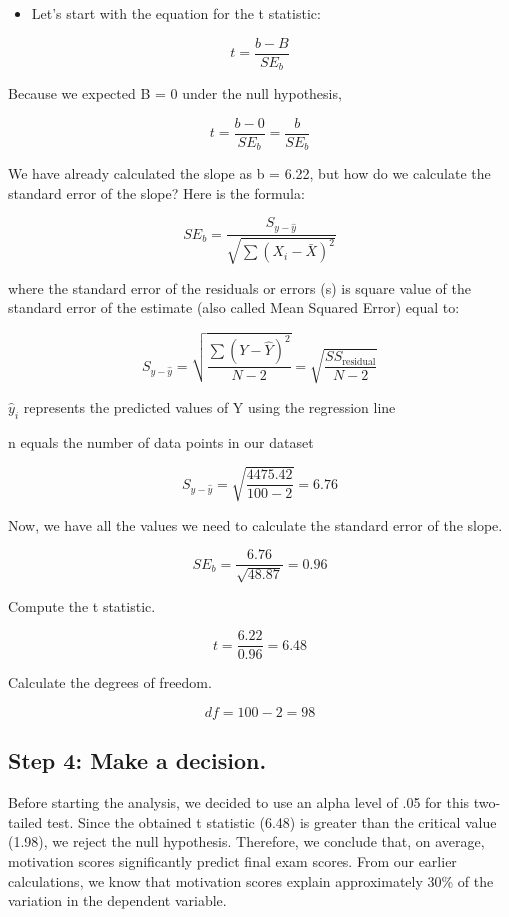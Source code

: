 \documentclass[
  letterpaper,
  DIV=11,
  numbers=noendperiod]{scrreprt}
\providecommand{\tightlist}{%
  \setlength{\itemsep}{0pt}\setlength{\parskip}{0pt}}
\begin{document}
\begin{itemize}
\tightlist
\item
  Let's start with the equation for the t statistic:
\end{itemize}

\[
t = \frac{b - B}{SE_b}
\]

Because we expected B = 0 under the null hypothesis,

\[
t = \frac{b - 0}{SE_b} = \frac{b}{SE_b}
\]

We have already calculated the slope as b = 6.22, but how do we
calculate the standard error of the slope? Here is the formula:

\[
SE_b = \frac{S_{y-\hat{y}}}{\sqrt{\sum (X_i - \bar{X})^2}}
\]

where the standard error of the residuals or errors (s) is square value
of the standard error of the estimate (also called Mean Squared Error)
equal to:

\[
S_{y-\hat{y}} = \sqrt{\frac{\sum (Y - \hat{Y})^2}{N - 2}} = \sqrt{\frac{SS_{\text{residual}}}{N - 2}}
\]

\(\hat{y}_i\) represents the predicted values of Y using the regression
line

n equals the number of data points in our dataset

\[
S_{y-\hat{y}} = \sqrt{\frac{4475.42}{100 - 2}} = 6.76
\]

Now, we have all the values we need to calculate the standard error of
the slope.

\[
SE_b = \frac{6.76}{\sqrt{48.87}} = 0.96
\]

Compute the t statistic.

\[
t = \frac{6.22}{0.96} = 6.48
\]

Calculate the degrees of freedom.

\[
df = 100 - 2 = 98
\]

\subsection*{Step 4: Make a decision.}\label{step-4-make-a-decision.}

Before starting the analysis, we decided to use an alpha level of .05
for this two-tailed test. Since the obtained t statistic (6.48) is
greater than the critical value (1.98), we reject the null hypothesis.
Therefore, we conclude that, on average, motivation scores significantly
predict final exam scores. From our earlier calculations, we know that
motivation scores explain approximately 30\% of the variation in the
dependent variable.
\end{document}
